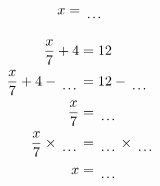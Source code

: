 \documentclass[12pt]{article}
\newcounter{minipagecount}
\begin{document}
\begin{multicols}{2}
\begin{minipage}[t]{0.45\textwidth}
\begin{align*}
        x &= \dotuline{\hspace{5mm}}\\
    \end{align*}
\end{minipage} %
\noindent{(\theminipagecount)}\hspace{0.1mm} %
\begin{minipage}[t]{0.45\textwidth} %
    \vspace{-26pt}  %
    \raggedright %
    \begin{align*} %
        \frac{x}{7} + 4 &= 12\\
        \frac{x}{7} + 4 - \dotuline{\hspace{5mm}} &= 12 - \dotuline{\hspace{5mm}}\\
        \frac{x}{7} &= \dotuline{\hspace{5mm}}\\
        \frac{x}{7} \times\dotuline{\hspace{5mm}} &= \dotuline{\hspace{5mm}} \times\dotuline{\hspace{5mm}}\\
        x &= \dotuline{\hspace{5mm}}\\
    \end{align*}
\end{minipage}\newpage
\noindent{(\theminipagecount)}\hspace{0.1mm} %
\begin{minipage}[t]{0.45\textwidth} %
    \vspace{-26pt}  %

\end{minipage}
\end{multicols}
\end{document}
